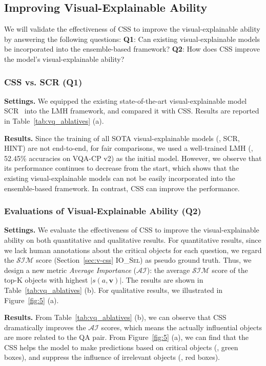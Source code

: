 \documentclass[10pt,twocolumn,letterpaper]{article}
\begin{document}
\subsection{Improving Visual-Explainable Ability}

We will validate the effectiveness of CSS to improve the visual-explainable ability by answering the following questions: \textbf{Q1}: Can existing visual-explainable models be incorporated into the ensemble-based framework? \textbf{Q2}: How does CSS improve the model's visual-explainable ability?


\subsubsection{CSS vs. SCR (Q1)}

\noindent\textbf{Settings.} We equipped the existing state-of-the-art visual-explainable model SCR~\cite{wu2019self} into the LMH framework, and compared it with CSS. Results are reported in Table~\ref{tab:vq_ablatives} (a).

\noindent\textbf{Results.} Since the training of all SOTA visual-explainable models (\eg, SCR, HINT) are not end-to-end, for fair comparisons, we used a well-trained LMH (\ie, 52.45\% accuracies on VQA-CP v2) as the initial model. However, we observe that its performance continues to decrease from the start, which shows that the existing visual-explainable models can not be easily incorporated into the ensemble-based framework. In contrast, CSS can improve the performance.


\subsubsection{Evaluations of Visual-Explainable Ability (Q2)}

\noindent\textbf{Settings.} We evaluate the effectiveness of CSS to improve the visual-explainable ability on both quantitative and qualitative results. For quantitative results, since we lack human annotations about the critical objects for each question, we regard the $\mathcal{SIM}$ score (Section~\ref{sec:v-css} \textsc{IO\_Sel}) as pseudo ground truth. Thus, we design a new metric \emph{Average Importance} ($\mathcal{AI}$): the average $\mathcal{SIM}$ score of the top-K objects with highest $|s(a, \bm{v})|$. The results are shown in Table~\ref{tab:vq_ablatives} (b). For qualitative results, we illustrated in Figure~\ref{fig:5} (a).

\noindent\textbf{Results.} From Table~\ref{tab:vq_ablatives} (b), we can observe that CSS dramatically improves the $\mathcal{AI}$ scores, which means the actually influential objects are more related to the QA pair. From Figure~\ref{fig:5} (a), we can find that the CSS helps the model to make predictions based on critical objects (\ie, green boxes), and suppress the influence of irrelevant objects (\ie, red boxes).
\end{document}

